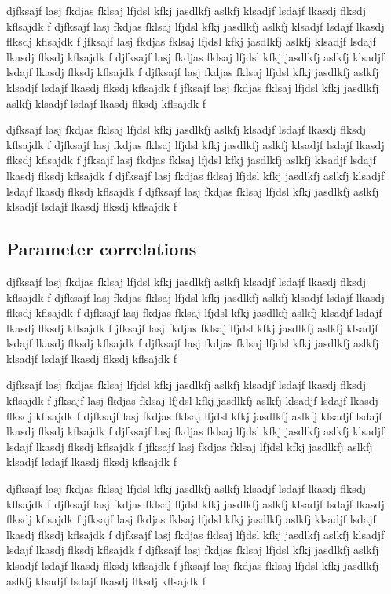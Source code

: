 \documentclass[twocolumn]{../../common/aa}
\begin{document}
djfksajf lasj fkdjas fklsaj lfjdsl kfkj jasdlkfj aslkfj klsadjf lsdajf lkasdj flksdj kflsajdk f
djfksajf lasj fkdjas fklsaj lfjdsl kfkj jasdlkfj aslkfj klsadjf lsdajf lkasdj flksdj kflsajdk f
jfksajf lasj fkdjas fklsaj lfjdsl kfkj jasdlkfj aslkfj klsadjf lsdajf lkasdj flksdj kflsajdk f
djfksajf lasj fkdjas fklsaj lfjdsl kfkj jasdlkfj aslkfj klsadjf lsdajf lkasdj flksdj kflsajdk f
djfksajf lasj fkdjas fklsaj lfjdsl kfkj jasdlkfj aslkfj klsadjf lsdajf lkasdj flksdj kflsajdk f
jfksajf lasj fkdjas fklsaj lfjdsl kfkj jasdlkfj aslkfj klsadjf lsdajf lkasdj flksdj kflsajdk f

djfksajf lasj fkdjas fklsaj lfjdsl kfkj jasdlkfj aslkfj klsadjf lsdajf lkasdj flksdj kflsajdk f
djfksajf lasj fkdjas fklsaj lfjdsl kfkj jasdlkfj aslkfj klsadjf lsdajf lkasdj flksdj kflsajdk f
jfksajf lasj fkdjas fklsaj lfjdsl kfkj jasdlkfj aslkfj klsadjf lsdajf lkasdj flksdj kflsajdk f
djfksajf lasj fkdjas fklsaj lfjdsl kfkj jasdlkfj aslkfj klsadjf lsdajf lkasdj flksdj kflsajdk f
djfksajf lasj fkdjas fklsaj lfjdsl kfkj jasdlkfj aslkfj klsadjf lsdajf lkasdj flksdj kflsajdk f

\subsection{Parameter correlations}
\label{sec:correlations}

djfksajf lasj fkdjas fklsaj lfjdsl kfkj jasdlkfj aslkfj klsadjf lsdajf lkasdj flksdj kflsajdk f
djfksajf lasj fkdjas fklsaj lfjdsl kfkj jasdlkfj aslkfj klsadjf lsdajf lkasdj flksdj kflsajdk f
djfksajf lasj fkdjas fklsaj lfjdsl kfkj jasdlkfj aslkfj klsadjf lsdajf lkasdj flksdj kflsajdk f
jfksajf lasj fkdjas fklsaj lfjdsl kfkj jasdlkfj aslkfj klsadjf lsdajf lkasdj flksdj kflsajdk f
djfksajf lasj fkdjas fklsaj lfjdsl kfkj jasdlkfj aslkfj klsadjf lsdajf lkasdj flksdj kflsajdk f

djfksajf lasj fkdjas fklsaj lfjdsl kfkj jasdlkfj aslkfj klsadjf lsdajf lkasdj flksdj kflsajdk f
jfksajf lasj fkdjas fklsaj lfjdsl kfkj jasdlkfj aslkfj klsadjf lsdajf lkasdj flksdj kflsajdk f
djfksajf lasj fkdjas fklsaj lfjdsl kfkj jasdlkfj aslkfj klsadjf lsdajf lkasdj flksdj kflsajdk f
djfksajf lasj fkdjas fklsaj lfjdsl kfkj jasdlkfj aslkfj klsadjf lsdajf lkasdj flksdj kflsajdk f
jfksajf lasj fkdjas fklsaj lfjdsl kfkj jasdlkfj aslkfj klsadjf lsdajf lkasdj flksdj kflsajdk f

djfksajf lasj fkdjas fklsaj lfjdsl kfkj jasdlkfj aslkfj klsadjf lsdajf lkasdj flksdj kflsajdk f
djfksajf lasj fkdjas fklsaj lfjdsl kfkj jasdlkfj aslkfj klsadjf lsdajf lkasdj flksdj kflsajdk f
jfksajf lasj fkdjas fklsaj lfjdsl kfkj jasdlkfj aslkfj klsadjf lsdajf lkasdj flksdj kflsajdk f
djfksajf lasj fkdjas fklsaj lfjdsl kfkj jasdlkfj aslkfj klsadjf lsdajf lkasdj flksdj kflsajdk f
djfksajf lasj fkdjas fklsaj lfjdsl kfkj jasdlkfj aslkfj klsadjf lsdajf lkasdj flksdj kflsajdk f
jfksajf lasj fkdjas fklsaj lfjdsl kfkj jasdlkfj aslkfj klsadjf lsdajf lkasdj flksdj kflsajdk f
\end{document}
